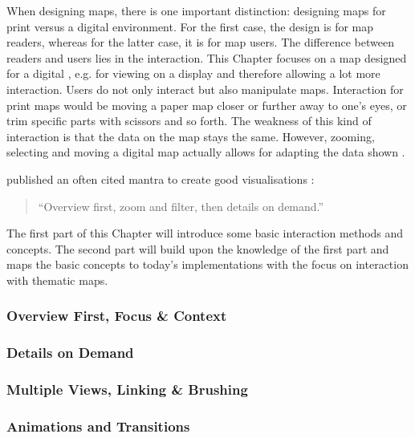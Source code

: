 When designing maps, there is one important distinction: designing maps for print versus a digital environment. For the first case, the design is for map readers, whereas for the latter case, it is for map users. The difference between readers and users lies in the interaction. This Chapter focuses on a map designed for a digital , e.g. for viewing on a display and therefore allowing a lot more interaction. Users do not only interact but also manipulate maps. Interaction for print maps would be moving a paper map closer or further away to one's eyes, or trim specific parts with scissors and so forth. The weakness of this kind of interaction is that the data on the map stays the same. However, zooming, selecting and moving a digital map actually allows for adapting the data shown .

\citeauthor{Shneiderman1996} published an often cited mantra to create good visualisations :
\begin{quote}
``Overview first, zoom and filter, then details on demand.''
\end{quote}

The first part of this Chapter will introduce some basic interaction methods and concepts. The second part will build upon the knowledge of the first part and maps the basic concepts to today's implementations with the focus on interaction with thematic maps.

\subsubsection{Overview First, Focus \& Context}


\subsubsection{Details on Demand}


\subsubsection{Multiple Views, Linking \& Brushing}
\label{s:linking-brushing}


\subsubsection{Animations and Transitions}


